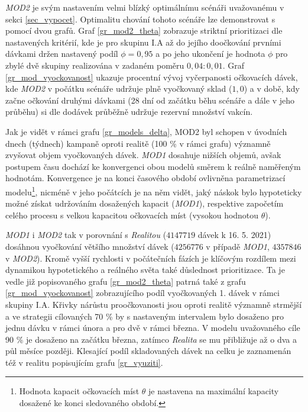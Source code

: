 \emph{MOD2} je svým nastavením velmi blízký optimálnímu scénáři uvažovanému v sekci \ref{sec_vypocet}. Optimalitu chování tohoto scénáře lze demonstrovat s pomocí dvou grafů. Graf \ref{gr_mod2_theta} zobrazuje striktní prioritizaci dle nastavených kritérií, kde je pro skupinu I.A až do jejího doočkování prvními dávkami držen nastavený podíl $\phi=0,95$ a po jeho ukončení je hodnota $\phi$ pro zbylé dvě skupiny realizována v zadaném poměru $0,04:0,01$. Graf \ref{gr_mod_vyockovanost} ukazuje procentní vývoj vyčerpanosti očkovacích dávek, kde \emph{MOD2} v počátku scénáře udržuje plně vyočkovaný sklad ($1,0$) a v době, kdy začne očkování druhými dávkami (28 dní od začátku běhu scénáře a dále v jeho průběhu) si dle dodávek průběžně udržuje rezervní množství vakcín.

Jak je vidět v rámci grafu \ref{gr_models_delta}, MOD2 byl schopen v úvodních dnech (týdnech) kampaně oproti realitě (100 \% v rámci grafu) významně zvyšovat objem vyočkovaných dávek. \emph{MOD1} dosahuje nižších objemů, avšak postupem času dochází ke konvergenci obou modelů směrem k reálně naměřeným hodnotám. Konvergence je na konci časového období ovlivněna parametrizací modelu\footnote{Hodnota kapacit očkovacích míst $\theta$ je nastavena na maximální kapacity dosažené ke konci sledovaného období.}, nicméně v jeho počátcích je na něm vidět, jaký náskok bylo hypoteticky možné získat udržováním dosažených kapacit (\emph{MOD1}), respektive započetím celého procesu s velkou kapacitou očkovacích míst (vysokou hodnotou $\theta$).

\emph{MOD1} i \emph{MOD2} tak v porovnání s \emph{Realitou} ($4 147 719$ dávek k 16. 5. 2021) dosáhnou vyočkování většího množství dávek ($4 256 776$ v případě \emph{MOD1}, $4 357 846$ v \emph{MOD2}). Kromě vyšší rychlosti v počátečních fázích je klíčovým rozdílem mezi dynamikou hypotetického a reálného světa také důslednost prioritizace. Ta je vedle již popisovaného grafu \ref{gr_mod2_theta} patrná také z grafu \ref{gr_mod_vyockovanost} zobrazujícího podíl vyočkovaných 1. dávek v rámci skupiny I.A. Křivky nárůstu proočkovanosti jsou oproti realitě významně strmější a ve strategii cílovaných 70 \% by s nastaveným intervalem bylo dosaženo pro jednu dávku v rámci února a pro dvě v rámci března. V modelu uvažovaného cíle 90 \% je dosaženo na začátku března, zatímco \emph{Realita} se mu přibližuje až o dva a půl měsíce později. Klesající podíl skladovaných dávek na celku je zaznamenán též v realitu popisujícím grafu \ref{gr_vyuziti}.



